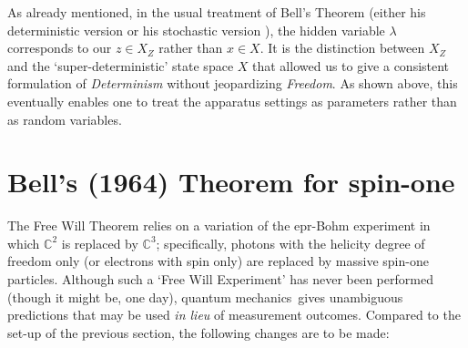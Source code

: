 \documentclass[11pt]{article}
\newcommand{\epr}{{\sc epr}}
\newcommand{\qm}{quantum mechanics}
\newcommand{\lm}{\lambda} \newcommand{\Lm}{\Lambda}
\newcommand{\C}{{\mathbb C}} \newcommand{\D}{{\mathbb D}}
\begin{document}
As already mentioned, in the usual treatment of Bell's Theorem (either his deterministic version \cite{Bell1,Bub} or his  stochastic version \cite{Bell4,Bub,JB,Gill,Jaeger,Maudlin,Seevinck,WW}), the hidden variable $\lm$ corresponds to  our
 $z\in X_Z$ rather than $x\in X$. It is the distinction  between $X_Z$ and the `super-deterministic' state space $X$ that allowed us to give a consistent formulation of \emph{Determinism} without jeopardizing  \emph{Freedom}. As  shown above, this eventually enables one to treat the apparatus settings as parameters rather than as random variables.

\section{Bell's (1964) Theorem for spin-one}\label{BT1sec}
The Free Will Theorem relies on a variation of the \epr-Bohm experiment in which $\C^2$ is replaced by $\C^3$; specifically,  photons with the helicity degree of freedom only (or electrons with spin only) are replaced by massive spin-one particles. Although such a `Free Will Experiment' has never been performed (though it might be, one day), \qm\ gives unambiguous predictions that may be used \emph{in lieu} of measurement outcomes. Compared to the set-up of the previous section, the following changes are to be made:
\end{document}
